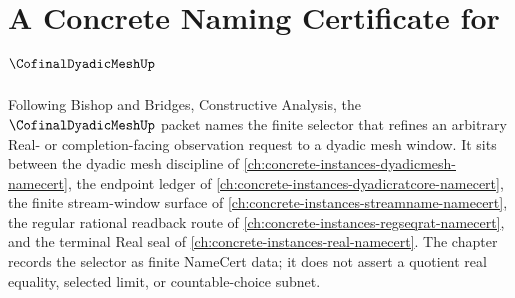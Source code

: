 \chapter{A Concrete Naming Certificate for $\CofinalDyadicMeshUp$}
\label{ch:concrete-instances-cofinal-dyadic-mesh-namecert}

Following Bishop and Bridges, Constructive Analysis, the $\CofinalDyadicMeshUp$ packet names the finite selector that refines an arbitrary Real- or completion-facing observation request to a dyadic mesh window. It sits between the dyadic mesh discipline of \autoref{ch:concrete-instances-dyadicmesh-namecert}, the endpoint ledger of \autoref{ch:concrete-instances-dyadicratcore-namecert}, the finite stream-window surface of \autoref{ch:concrete-instances-streamname-namecert}, the regular rational readback route of \autoref{ch:concrete-instances-regseqrat-namecert}, and the terminal Real seal of \autoref{ch:concrete-instances-real-namecert}. The chapter records the selector as finite NameCert data; it does not assert a quotient real equality, selected limit, or countable-choice subnet.

